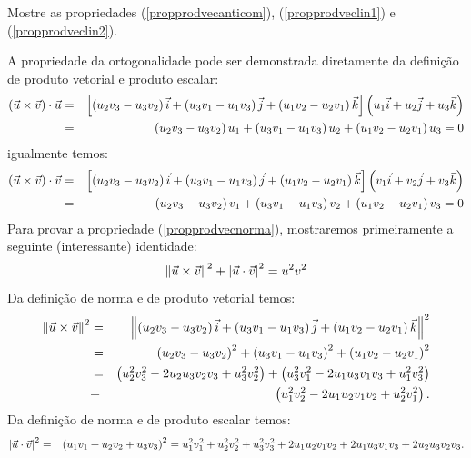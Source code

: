\begin{prob} Mostre as propriedades (\ref{propprodvecanticom}), (\ref{propprodveclin1}) e (\ref{propprodveclin2}).  
\end{prob}
A propriedade da ortogonalidade pode ser demonstrada diretamente da definição de produto vetorial e produto escalar:
\begin{eqnarray*}\left(\vec{u}\times \vec{v}\right)\cdot \vec{u}&=&\left[\left(u_2v_3-u_3v_2\right)\vec{i}+\left(u_3v_1-u_1v_3\right)\vec{j}+\left(u_1v_2-u_2v_1\right)\vec{k}\right]\left(u_1\vec{i}+u_2\vec{j}+u_3\vec{k}\right)\\
&=&\left(u_2v_3-u_3v_2\right)u_1+\left(u_3v_1-u_1v_3\right)u_2+\left(u_1v_2-u_2v_1\right)u_3=0
\end{eqnarray*}
igualmente temos:
\begin{eqnarray*}\left(\vec{u}\times \vec{v}\right)\cdot \vec{v}&=&\left[\left(u_2v_3-u_3v_2\right)\vec{i}+\left(u_3v_1-u_1v_3\right)\vec{j}+\left(u_1v_2-u_2v_1\right)\vec{k}\right]\left(v_1\vec{i}+v_2\vec{j}+v_3\vec{k}\right)\\
&=&\left(u_2v_3-u_3v_2\right)v_1+\left(u_3v_1-u_1v_3\right)v_2+\left(u_1v_2-u_2v_1\right)v_3=0
\end{eqnarray*}
Para provar a propriedade (\ref{propprodvecnorma}), mostraremos primeiramente a seguinte (interessante) identidade:
\begin{equation}\label{identnorma}\left\|\vec{u}\times \vec{v}\right\|^2+\left|\vec{u}\cdot \vec{v}\right|^2=u^2v^2
\end{equation}
Da definição de norma e de produto vetorial temos:
\begin{eqnarray}\label{calcnormaprodvec}
\left\|\vec{u}\times \vec{v}\right\|^2&=&\left\|\left(u_2v_3-u_3v_2\right)\vec{i}+\left(u_3v_1-u_1v_3\right)\vec{j}+\left(u_1v_2-u_2v_1\right)\vec{k}\right\|^2\nonumber\\
&=&\left(u_2v_3-u_3v_2\right)^2+\left(u_3v_1-u_1v_3\right)^2+\left(u_1v_2-u_2v_1\right)^2\nonumber\\
&=&\left(u_2^2v_3^2-2u_2u_3v_2v_3+u_3^2v_2^2\right)+\left(u_3^2v_1^2-2u_1u_3v_1v_3+u_1^2v_3^2\right) \nonumber\\
&+&\left(u_1^2v_2^2-2u_1u_2v_1v_2+u_2^2v_1^2\right).
\end{eqnarray}
Da definição de norma e de produto escalar temos:
\begin{eqnarray*}
\left|\vec{u}\cdot \vec{v}\right|^2&=&\left(u_1v_1+u_2v_2+u_3v_3\right)^2=u_1^2v_1^2+u_2^2v_2^2+u_3^2v_3^2+2u_1u_2v_1v_2+2u_1u_3v_1v_3+2u_2u_3v_2v_3.
\end{eqnarray*}
